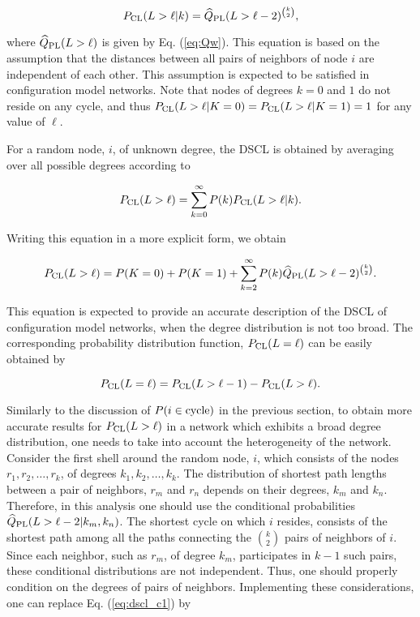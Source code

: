 \documentclass[preprint,pre,superscriptaddress,showpacs]{revtex4}
\begin{document}
\begin{equation}
P_{\rm CL}(L>\ell | k) = {\widehat Q}_{\rm PL}(L>\ell-2)^{\binom{k}{2}},
\label{eq:dscl_c1}
\end{equation}

\noindent
where $\widehat Q_{\rm PL}(L>\ell)$ is given by
Eq. (\ref{eq:Qw}).
This equation is based on the assumption that the distances between
all pairs of neighbors of node $i$ are independent of each other.
This assumption is expected to be satisfied in configuration model networks.
Note that nodes of degrees $k=0$ and $1$ do not reside on any cycle,
and thus
$P_{\rm CL}(L>\ell |K = 0 ) = P_{\rm CL}(L>\ell |K = 1 ) =1$ 
for any
value of $\ell$.

For a random node, $i$, of unknown degree, the DSCL
is obtained by averaging over all possible degrees according to

\begin{equation}
P_{\rm CL}(L>\ell) = 
\sum_{k=0}^{\infty} P(k) P_{\rm CL}(L>\ell | k). 
\label{eq:dscl}
\end{equation}

\noindent
Writing this equation in a more explicit form, we obtain

\begin{equation}
P_{\rm CL}(L>\ell) 
= 
P(K=0) + P(K=1) 
+ 
\sum_{k=2}^{\infty} P(k) {\widehat Q}_{\rm PL}(L>\ell-2)^{\binom{k}{2}}.
\end{equation}

\noindent
This equation is expected to provide an accurate description
of the DSCL of configuration model networks,
when the degree distribution is not too broad.
The corresponding probability distribution function, 
$P_{\rm CL}(L=\ell)$
can be easily obtained by

\begin{equation}
P_{\rm CL}(L=\ell) = P_{\rm CL}(L>\ell-1) - P_{\rm CL}(L>\ell).
\end{equation}

Similarly to the discussion of 
$P(i \in {\rm cycle})$ in the previous section,
to obtain more accurate results for 
$P_{\rm CL}(L>\ell)$ in a
network which exhibits a broad degree distribution, one
needs to take into account the heterogeneity 
of the network. 
Consider the first shell around the random node, $i$,
which consists of the nodes $r_1,r_2,\dots,r_k$,
of degrees $k_1,k_2,\dots,k_k$.
The distribution of shortest path lengths between a pair of neighbors,
$r_m$ and $r_n$ depends on their degrees, $k_m$ and $k_n$.
Therefore, in this analysis one should use the conditional probabilities
$\widehat Q_{\rm PL}(L>\ell-2 | k_m,k_n)$.
The shortest cycle on which $i$ resides, consists of the shortest
path among all the paths connecting the $\binom{k}{2}$ pairs
of neighbors of $i$. Since each neighbor, such as $r_m$,
of degree $k_m$, participates in $k-1$ such pairs, these
conditional distributions are not independent.
Thus, one should properly  condition
on the degrees of pairs of neighbors.
Implementing these considerations, one can replace 
Eq. (\ref{eq:dscl_c1}) by
\end{document}
